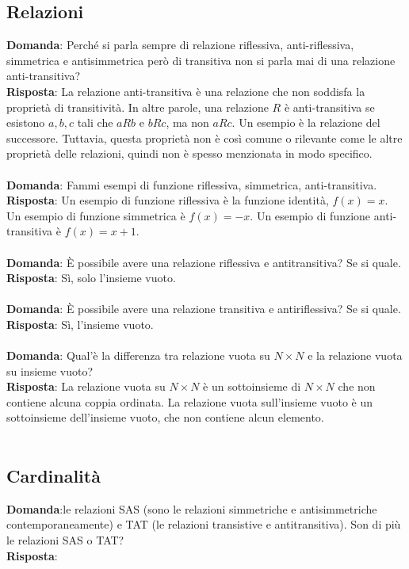 \documentclass{article}
\begin{document}
\subsection{Relazioni}
\textbf{Domanda}: Perché si parla sempre di relazione riflessiva, anti-riflessiva, simmetrica e antisimmetrica però di transitiva non si parla mai di una relazione anti-transitiva?\\
\textbf{Risposta}: La relazione anti-transitiva è una relazione che non soddisfa la proprietà di transitività. In altre parole, una relazione $R$ è anti-transitiva se esistono $a, b, c$ tali che $a R b$ e $b R c$, ma non $a R c$. Un esempio è la relazione del successore. Tuttavia, questa proprietà non è così comune o rilevante come le altre proprietà delle relazioni, quindi non è spesso menzionata in modo specifico. \\ \\
\textbf{Domanda}: Fammi esempi di funzione riflessiva, simmetrica, anti-transitiva. \\
\textbf{Risposta}: Un esempio di funzione riflessiva è la funzione identità, $f(x) = x$. Un esempio di funzione simmetrica è $f(x) = -x$. Un esempio di funzione anti-transitiva è $f(x) = x + 1$. \\ \\
\textbf{Domanda}:  \`E possibile avere una relazione riflessiva e antitransitiva? Se si quale. \\
\textbf{Risposta}: Sì, solo l'insieme vuoto. \\ \\
\textbf{Domanda}:  \`E possibile avere una relazione transitiva e antiriflessiva? Se si quale. \\
\textbf{Risposta}: Sì, l'insieme vuoto. \\ \\
\textbf{Domanda}: Qual'è la differenza tra relazione vuota su $N \times N$ e la relazione vuota su insieme vuoto? \\
\textbf{Risposta}: La relazione vuota su $N \times N$ è un sottoinsieme di $N \times N$ che non contiene alcuna coppia ordinata. La relazione vuota sull'insieme vuoto è un sottoinsieme dell'insieme vuoto, che non contiene alcun elemento. \\ \\

\subsection{Cardinalità}
\textbf{Domanda}:le relazioni SAS (sono le relazioni simmetriche e antisimmetriche contemporaneamente) e TAT (le relazioni transistive e antitransitiva). Son di più le relazioni SAS o TAT? \\
\textbf{Risposta}: 
\end{document}
